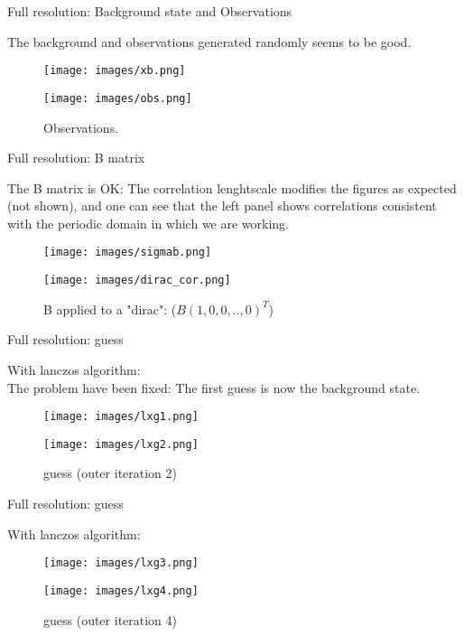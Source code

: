 \documentclass[francais]{beamer}
\begin{document}
\begin{frame}{Full resolution: Background state and Observations}
\begin{center}
The background and observations generated randomly seems to be good.\\
\begin{figure}
  \texttt{[image: images/xb.png]}
  \caption{background state $x^b$.}
\endminipage\hfill
{}
  \texttt{[image: images/obs.png]}
  \caption{Observations.}
\endminipage
\end{figure}
\end{center}
\end{frame}

\begin{frame}{Full resolution: B matrix}
\begin{center}
The B matrix is OK: The correlation lenghtscale modifies the figures as expected (not shown), and one can see that the left panel shows correlations consistent with the periodic domain in which we are working.\\ 
\begin{figure}
  \texttt{[image: images/sigmab.png]}
  \caption{Background error field $\sigma^b$.}
\endminipage\hfill
{}
  \texttt{[image: images/dirac\_cor.png]}
  \caption{B applied to a "dirac": ($B(1,0,0,..,0)^T$)}
\endminipage
\end{figure}
\end{center}
\end{frame}

\begin{frame}{Full resolution: guess}
\begin{center}
With lanczos algorithm:\\
The problem have been fixed: The first guess is now the background state.
\begin{figure}
  \texttt{[image: images/lxg1.png]}
  \caption{guess (outer iteration 1)}
\endminipage\hfill
{}
  \texttt{[image: images/lxg2.png]}
  \caption{guess (outer iteration 2)}
\endminipage
\end{figure}
\end{center}
\end{frame}

\begin{frame}{Full resolution: guess}
\begin{center}
With lanczos algorithm:
\begin{figure}
  \texttt{[image: images/lxg3.png]}
  \caption{guess (outer iteration 3)}
\endminipage \hfill
{}%
  \texttt{[image: images/lxg4.png]}
  \caption{guess (outer iteration 4)}
\endminipage
\end{figure}
\end{center}
\end{frame}
\end{document}
